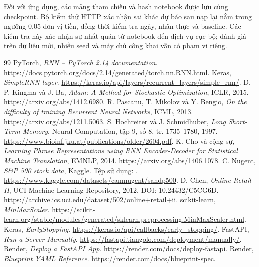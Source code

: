 \documentclass[12pt,a4paper]{report}
\begin{document}
Đối với ứng dụng, các mảng tham chiếu và hash notebook được lưu cùng checkpoint. Bộ kiểm thử HTTP xác nhận sai khác dự báo sau nạp lại nằm trong ngưỡng 0.05 đơn vị tiền, đồng thời kiểm tra ngày, nhãn thực và baseline. Các kiểm tra này xác nhận sự nhất quán từ notebook đến dịch vụ cục bộ; đánh giá trên dữ liệu mới, nhiều seed và máy chủ công khai vẫn có phạm vi riêng.

\clearpage
{}
\renewcommand{\bibname}{Tài liệu tham khảo}
\begin{thebibliography}{99}
 PyTorch, \emph{RNN -- PyTorch 2.14 documentation}. \url{https://docs.pytorch.org/docs/2.14/generated/torch.nn.RNN.html}.
 Keras, \emph{SimpleRNN layer}. \url{https://keras.io/api/layers/recurrent_layers/simple_rnn/}.
 D. P. Kingma và J. Ba, \emph{Adam: A Method for Stochastic Optimization}, ICLR, 2015. \url{https://arxiv.org/abs/1412.6980}.
 R. Pascanu, T. Mikolov và Y. Bengio, \emph{On the difficulty of training Recurrent Neural Networks}, ICML, 2013. \url{https://arxiv.org/abs/1211.5063}.
 S. Hochreiter và J. Schmidhuber, \emph{Long Short-Term Memory}, Neural Computation, tập 9, số 8, tr. 1735--1780, 1997. \url{https://www.bioinf.jku.at/publications/older/2604.pdf}.
 K. Cho và cộng sự, \emph{Learning Phrase Representations using RNN Encoder-Decoder for Statistical Machine Translation}, EMNLP, 2014. \url{https://arxiv.org/abs/1406.1078}.
 C. Nugent, \emph{S\&P 500 stock data}, Kaggle. Tệp sử dụng: . \url{https://www.kaggle.com/datasets/camnugent/sandp500}.
 D. Chen, \emph{Online Retail II}, UCI Machine Learning Repository, 2012. DOI: 10.24432/C5CG6D. \url{https://archive.ics.uci.edu/dataset/502/online+retail+ii}.
 scikit-learn, \emph{MinMaxScaler}. \url{https://scikit-learn.org/stable/modules/generated/sklearn.preprocessing.MinMaxScaler.html}.
 Keras, \emph{EarlyStopping}. \url{https://keras.io/api/callbacks/early_stopping/}.
 FastAPI, \emph{Run a Server Manually}. \url{https://fastapi.tiangolo.com/deployment/manually/}.
 Render, \emph{Deploy a FastAPI App}. \url{https://render.com/docs/deploy-fastapi}.
 Render, \emph{Blueprint YAML Reference}. \url{https://render.com/docs/blueprint-spec}.
\end{thebibliography}
\end{document}
